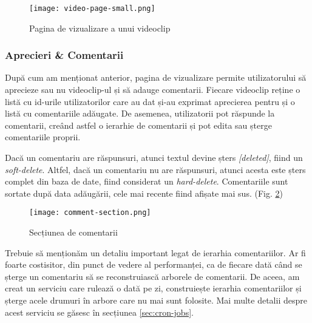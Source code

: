 \begin{figure}[h]
    \centering
    \texttt{[image: video-page-small.png]}
    \caption{Pagina de vizualizare a unui videoclip}
    \label{fig:video-page}
\end{figure}


\subsubsection{Aprecieri \& Comentarii}
După cum am menționat anterior, pagina de vizualizare permite utilizatorului să aprecieze
sau nu videoclip-ul și să adauge comentarii. Fiecare videoclip reține o listă cu id-urile
utilizatorilor care au dat și-au exprimat aprecierea pentru și o listă cu comentariile adăugate.
De asemenea, utilizatorii pot răspunde la comentarii, creând astfel o ierarhie de comentarii
și pot edita sau șterge comentariile proprii.
\par
Dacă un comentariu are răspunsuri, atunci textul devine șters \textit{[deleted]}, fiind un \textit{soft-delete}.
Altfel, dacă un comentariu nu are răspunsuri, atunci acesta este șters complet din baza de date,
fiind considerat un \textit{hard-delete}. Comentariile sunt sortate după data adăugării, cele mai
recente fiind afișate mai sus. (Fig. \ref{fig:comment-section})

\begin{figure}[h]
    \centering
    \texttt{[image: comment-section.png]}
    \caption{Secțiunea de comentarii}
    \label{fig:comment-section}
\end{figure}

Trebuie să menționăm un detaliu important legat de ierarhia comentariilor. Ar fi foarte costisitor,
din punct de vedere al performanței, ca de fiecare dată când se șterge un comentariu să se reconstruiască
arborele de comentarii. De aceea, am creat un serviciu care rulează o dată pe zi, construiește ierarhia
comentariilor și șterge acele drumuri în arbore care nu mai sunt folosite. Mai multe detalii despre
acest serviciu se găsesc în secțiunea \ref{sec:cron-jobs}.

